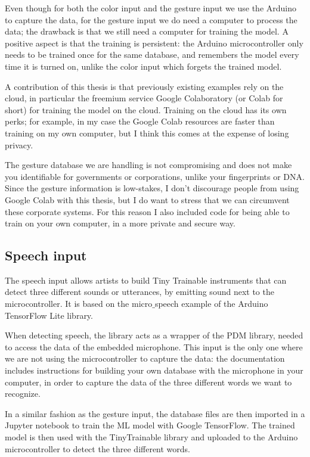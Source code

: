 Even though for both the color input and the gesture input we use the Arduino to capture the data, for the gesture input we do need a computer to process the data; the drawback is that we still need a computer for training the model. A positive aspect is that the training is persistent: the Arduino microcontroller only needs to be trained once for the same database, and remembers the model every time it is turned on, unlike the color input which forgets the trained model.

A contribution of this thesis is that previously existing examples rely on the cloud, in particular the freemium service Google Colaboratory \cite{website-google-colab} (or Colab for short) for training the model on the cloud. Training on the cloud has its own perks; for example, in my case the Google Colab resources are faster than training on my own computer, but I think this comes at the expense of losing privacy.

The gesture database we are handling is not compromising and does not make you identifiable for governments or corporations, unlike your fingerprints or DNA. Since the gesture information is low-stakes, I don't discourage people from using Google Colab with this thesis, but I do want to stress that we can circumvent these corporate systems. For this reason I also included code for being able to train on your own computer, in a more private and secure way.

\subsection{Speech input}

The speech input allows artists to build Tiny Trainable instruments that can detect three different sounds or utterances, by emitting sound next to the microcontroller.  It is based on the micro$\_$speech example of the Arduino TensorFlow Lite library.

When detecting speech, the library acts as a wrapper of the PDM library, needed to access the data of the embedded microphone. This input is the only one where we are not using the microcontroller to capture the data: the documentation includes instructions for building your own database with the microphone in your computer, in order to capture the data of the three different words we want to recognize. 

In a similar fashion as the gesture input, the database files are then imported in a Jupyter notebook to train the \acrshort{ML} model with Google TensorFlow. The trained model is then used with the TinyTrainable library and uploaded to the Arduino microcontroller to detect the three different words.

